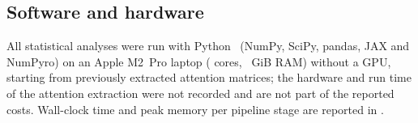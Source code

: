 


\subsection{Software and hardware}\label{sec:data-compute}
All statistical analyses were run with Python~\nPythonVersion{} (NumPy, SciPy, pandas, JAX and NumPyro) on an Apple M2~Pro laptop (\nHwCores{} cores, \nHwRamGiB{}~GiB RAM) without a GPU, starting from previously extracted attention matrices; the hardware and run time of the attention extraction were not recorded and are not part of the reported costs.
Wall-clock time and peak memory per pipeline stage are reported in .
